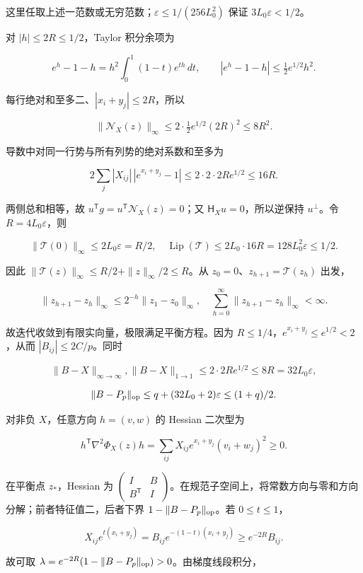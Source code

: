 \documentclass[11pt,a4paper]{article}
\begin{document}
这里任取上述一范数或无穷范数；\(\varepsilon\le1/(256L_0^2)\) 保证 \(3L_0\varepsilon<1/2\)。

对 \(|h|\le2R\le1/2\)，Taylor 积分余项为

\[
e^h-1-h=h^2\int_0^1(1-t)e^{th}\,dt,
\qquad |e^h-1-h|\le\tfrac12e^{1/2}h^2.
\]

每行绝对和至多二、\(|x_i+y_j|\le2R\)，所以

\[
\|\mathcal N_X(z)\|_\infty\le2\cdot\tfrac12e^{1/2}(2R)^2\le8R^2.
\]

导数中对同一行势与所有列势的绝对系数和至多为

\[
2\sum_j|X_{ij}|\,|e^{x_i+y_j}-1|
\le2\cdot2\cdot2Re^{1/2}\le16R.
\]

两侧总和相等，故 \(u^{\mathsf T}g=u^{\mathsf T}\mathcal N_X(z)=0\)；又 \(\mathsf H_Xu=0\)，所以逆保持 \(u^\perp\)。令 \(R=4L_0\varepsilon\)，则

\[
\|\mathcal T(0)\|_\infty\le2L_0\varepsilon=R/2,
\quad\operatorname{Lip}(\mathcal T)\le2L_0\cdot16R
=128L_0^2\varepsilon\le1/2.
\]

因此 \(\|\mathcal T(z)\|_\infty\le R/2+\|z\|_\infty/2\le R\)。从 \(z_0=0\)、\(z_{h+1}=\mathcal T(z_h)\) 出发，

\[
\|z_{h+1}-z_h\|_\infty\le2^{-h}\|z_1-z_0\|_\infty,
\quad\sum_{h=0}^{\infty}\|z_{h+1}-z_h\|_\infty<\infty.
\]

故迭代收敛到有限实向量，极限满足平衡方程。因为 \(R\le1/4\)，\(e^{x_i+y_j}\le e^{1/2}<2\)，从而 \(|B_{ij}|\le2C/p\)。同时

\[
\|B-X\|_{\infty\to\infty},\|B-X\|_{1\to1}
\le2\cdot2Re^{1/2}\le8R=32L_0\varepsilon,
\]

\[
\|B-P_p\|_{\rm op}\le q+(32L_0+2)\varepsilon\le(1+q)/2.
\]

对非负 \(X\)，任意方向 \(h=(v,w)\) 的 Hessian 二次型为

\[
h^{\mathsf T}\nabla^2\Phi_X(z)h
=\sum_{ij}X_{ij}e^{x_i+y_j}(v_i+w_j)^2\ge0.
\]

在平衡点 \(z_*\)，Hessian 为 \(\left(\begin{smallmatrix}I&B\\B^{\mathsf T}&I\end{smallmatrix}\right)\)。在规范子空间上，将常数方向与零和方向分解；前者特征值二，后者下界 \(1-\|B-P_p\|_{\rm op}\)。若 \(0\le t\le1\)，

\[
X_{ij}e^{t(x_i+y_j)}=B_{ij}e^{-(1-t)(x_i+y_j)}\ge e^{-2R}B_{ij}.
\]

故可取 \(\lambda=e^{-2R}(1-\|B-P_p\|_{\rm op})>0\)。由梯度线段积分，
\end{document}
